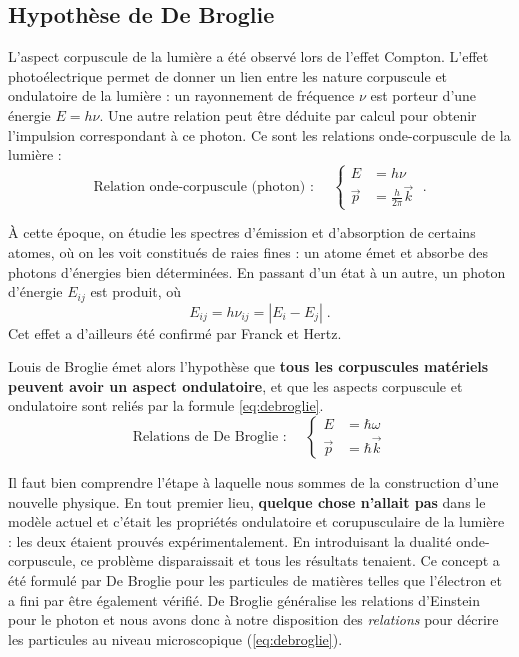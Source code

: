 \documentclass[12pt, a4paper]{book}
\begin{document}
\subsection{Hypothèse de De Broglie}
L'aspect corpuscule de la lumière a été observé lors de l'effet Compton. L'effet photoélectrique permet de donner un lien entre les nature corpuscule et ondulatoire de la lumière : un rayonnement de fréquence $\nu$ est porteur d'une énergie $E = h\nu$. Une autre relation peut être déduite par calcul pour obtenir l'impulsion correspondant à ce photon. Ce sont les relations onde-corpuscule de la lumière :
\begin{equation}
\boxed{
\text{Relation onde-corpuscule (photon) : } \quad \left\{ \begin{array}{ll}
E &= h\nu \\
\vec p &= \frac{h}{2\pi} \vec k
\end{array} \right. } \; .
\end{equation}

À cette époque, on étudie les spectres d'émission et d'absorption de certains atomes, où on les voit constitués de raies fines : un atome émet et absorbe des photons d'énergies bien déterminées. En passant d'un état à un autre, un photon d'énergie $E_{ij}$ est produit, où
$$E_{ij} = h\nu_{ij} = |E_i - E_j| \; .$$
Cet effet a d'ailleurs été confirmé par Franck et Hertz. \\


Louis de Broglie émet alors l'hypothèse que \textbf{tous les corpuscules matériels peuvent avoir un aspect ondulatoire}, et que les aspects corpuscule et ondulatoire sont reliés par la formule \eqref{eq:debroglie}.
\begin{equation} \label{eq:debroglie}
\boxed{
\text{Relations de De Broglie : } \quad \left\{ \begin{array}{ll}
E &= \hbar \omega \\
\vec p &= \hbar \vec k
\end{array} \right. } 
\end{equation}

Il faut bien comprendre l'étape à laquelle nous sommes de la construction d'une nouvelle physique. En tout premier lieu, \textbf{quelque chose n'allait pas} dans le modèle actuel et c'était les propriétés ondulatoire et corupusculaire de la lumière : les deux étaient prouvés expérimentalement. En introduisant la dualité onde-corpuscule, ce problème disparaissait et tous les résultats tenaient. Ce concept a été formulé par De Broglie pour les particules de matières telles que l'électron et a fini par être également vérifié. De Broglie généralise les relations d'Einstein pour le photon et nous avons donc à notre disposition des \textit{relations} pour décrire les particules au niveau microscopique (\ref{eq:debroglie}). \\
\end{document}
